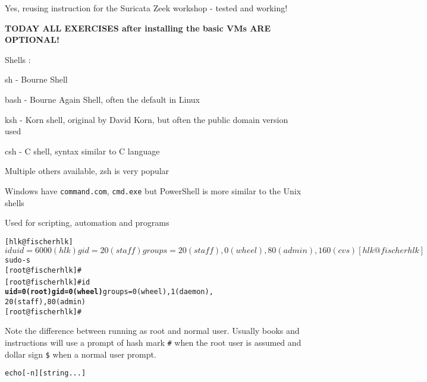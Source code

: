 \documentclass[Screen16to9,17pt]{foils}
\begin{document}
Yes, reusing instruction for the Suricata Zeek workshop - tested and working!

{\bf TODAY ALL EXERCISES after installing the basic VMs ARE OPTIONAL!}




\begin{list1}
\item Shells :
  \begin{list2}
    \item sh - Bourne Shell
\item bash - Bourne Again Shell, often the default in Linux
\item ksh - Korn shell, original by David Korn, but often the public domain version used
\item csh - C shell, syntax similar to C language
\item Multiple others available, zsh is very popular
  \end{list2}
\item Windows have \verb+command.com+, \verb+cmd.exe+ but PowerShell is more similar to the Unix shells
\item Used for scripting, automation and programs
\end{list1}





\begin{alltt}
\small
[hlk@fischer hlk]$ id
uid=6000(hlk) gid=20(staff) groups=20(staff),
0(wheel), 80(admin), 160(cvs)
[hlk@fischer hlk]$ sudo -s
[root@fischer hlk]#
[root@fischer hlk]# id {\bf
uid=0(root) gid=0(wheel)} groups=0(wheel), 1(daemon),
20(staff), 80(admin)
[root@fischer hlk]#
\end{alltt}

Note the difference between running as root and normal user. Usually books and instructions will use a prompt of hash mark \verb+#+ when the root user is assumed and dollar sign \verb+$+ when a normal user prompt.



\begin{alltt}
echo [-n] [string ...]
\end{alltt}
\end{document}
